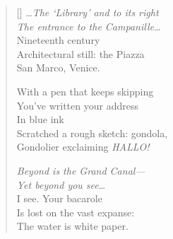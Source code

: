 \label{ch:postcard}
\settowidth{\versewidth}{The entrance to the Campanille. . . .}
\begin{verse}[\versewidth]
\ldots\textit{The `Library' and to its right\\
The entrance to the Campanille}\ldots\\
Nineteenth century\\
Architectural still: the Piazza\\
San Marco, Venice.

With a pen that keeps skipping\\
You've written your address\\
In blue ink\\
Scratched a rough sketch: gondola,\\
Gondolier exclaiming \textit{HALLO!}

\textit{Beyond is the Grand Canal---\\
Yet beyond you see}\ldots\\
I see. Your bacarole\\
Is lost on the vast expanse:\\
The water is white paper.
\end{verse}
